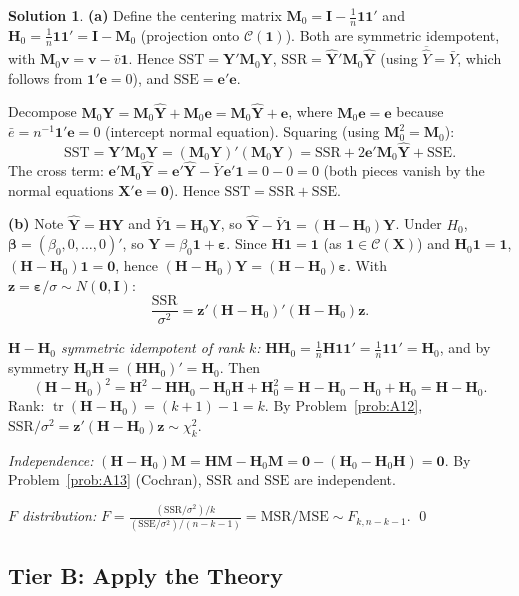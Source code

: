 \documentclass[12pt,a4paper]{article}
\theoremstyle{definition}
\newtheorem*{solution*}{Solution}
\DeclareMathOperator\tr{tr}
\newcommand{\SST}{\mathrm{SST}}
\newcommand{\SSR}{\mathrm{SSR}}
\newcommand{\SSE}{\mathrm{SSE}}
\newcommand{\MSR}{\mathrm{MSR}}
\newcommand{\MSE}{\mathrm{MSE}}
\newcommand{\bX}{\mathbf{X}}
\newcommand{\bY}{\mathbf{Y}}
\def\bb{\boldsymbol{\beta}}
\newcommand{\be}{\boldsymbol{\varepsilon}}
\newcommand{\bI}{\mathbf{I}}
\newcommand{\bH}{\mathbf{H}}
\newcommand{\bM}{\mathbf{M}}
\newcommand{\bone}{\mathbf{1}}
\newcommand{\bzero}{\mathbf{0}}
\newcommand{\bz}{\mathbf{z}}
\newcommand{\bv}{\mathbf{v}}
\newcommand{\calC}{\mathcal{C}}
\begin{document}
\begin{solution*}
\textbf{(a)} Define the centering matrix $\bM_0 = \bI - \frac{1}{n}\bone\bone'$ and $\bH_0 = \frac{1}{n}\bone\bone' = \bI - \bM_0$ (projection onto $\calC(\bone)$). Both are symmetric idempotent, with $\bM_0\bv = \bv - \bar{v}\bone$. Hence $\SST = \bY'\bM_0\bY$, $\SSR = \hat{\bY}'\bM_0\hat{\bY}$ (using $\overline{\hat{Y}} = \bar Y$, which follows from $\bone'\mathbf{e} = 0$), and $\SSE = \mathbf{e}'\mathbf{e}$.

Decompose $\bM_0\bY = \bM_0\hat{\bY} + \bM_0\mathbf{e} = \bM_0\hat{\bY} + \mathbf{e}$, where $\bM_0\mathbf{e} = \mathbf{e}$ because $\bar e = n^{-1}\bone'\mathbf{e} = 0$ (intercept normal equation). Squaring (using $\bM_0^2 = \bM_0$):
\[
\SST = \bY'\bM_0\bY = (\bM_0\bY)'(\bM_0\bY) = \SSR + 2\mathbf{e}'\bM_0\hat{\bY} + \SSE.
\]
The cross term: $\mathbf{e}'\bM_0\hat{\bY} = \mathbf{e}'\hat{\bY} - \bar{Y}\,\mathbf{e}'\bone = 0 - 0 = 0$ (both pieces vanish by the normal equations $\bX'\mathbf{e} = \bzero$). Hence $\SST = \SSR + \SSE$.

\textbf{(b)} Note $\hat{\bY} = \bH\bY$ and $\bar{Y}\bone = \bH_0\bY$, so $\hat{\bY} - \bar{Y}\bone = (\bH - \bH_0)\bY$. Under $H_0$, $\bb = (\beta_0, 0, \ldots, 0)'$, so $\bY = \beta_0\bone + \be$. Since $\bH\bone = \bone$ (as $\bone \in \calC(\bX)$) and $\bH_0\bone = \bone$, $(\bH - \bH_0)\bone = \bzero$, hence $(\bH - \bH_0)\bY = (\bH - \bH_0)\be$. With $\bz = \be/\sigma \sim N(\bzero, \bI)$:
\[
\frac{\SSR}{\sigma^2} = \bz'(\bH - \bH_0)'(\bH - \bH_0)\bz.
\]

\emph{$\bH - \bH_0$ symmetric idempotent of rank $k$:} $\bH\bH_0 = \frac{1}{n}\bH\bone\bone' = \frac{1}{n}\bone\bone' = \bH_0$, and by symmetry $\bH_0\bH = (\bH\bH_0)' = \bH_0$. Then
\[
(\bH - \bH_0)^2 = \bH^2 - \bH\bH_0 - \bH_0\bH + \bH_0^2 = \bH - \bH_0 - \bH_0 + \bH_0 = \bH - \bH_0.
\]
Rank: $\tr(\bH - \bH_0) = (k+1) - 1 = k$. By Problem~\ref{prob:A12}, $\SSR/\sigma^2 = \bz'(\bH - \bH_0)\bz \sim \chi^2_k$.

\emph{Independence:} $(\bH - \bH_0)\bM = \bH\bM - \bH_0\bM = \bzero - (\bH_0 - \bH_0\bH) = \bzero$. By Problem~\ref{prob:A13} (Cochran), $\SSR$ and $\SSE$ are independent.

\emph{$F$ distribution:} $F = \frac{(\SSR/\sigma^2)/k}{(\SSE/\sigma^2)/(n-k-1)} = \MSR/\MSE \sim F_{k,n-k-1}$. \qed
\end{solution*}

\subsection*{Tier B: Apply the Theory}
\end{document}
